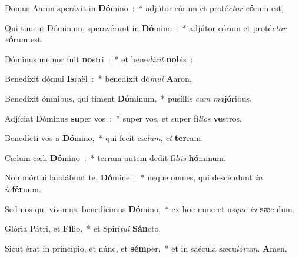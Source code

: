 \documentclass[letterpaper,12pt]{article} %
\begin{document}
\begin{parcolumns}[colwidths={1=268pt},rulebetween]{2}
{\begin{psalmverses}[1]
\item Domus Aaron sperávit in \textbf{Dó}mino~:~* adjútor eórum et proté\emph{ctor} \emph{e}\textbf{ó}rum est,
\item Qui timent Dóminum, speravérunt in \textbf{Dó}mino~:~* adjútor eórum et proté\emph{ctor} \emph{e}\textbf{ó}rum est.
\item Dóminus memor fuit \textbf{no}stri~:~* et bene\emph{dí}\emph{xit} \textbf{no}bis~:
\item Benedíxit dómui \textbf{Is}raël~:~* benedíxit dó\emph{mu}\emph{i} \textbf{A}aron.
\item Benedíxit ómnibus, qui timent \textbf{Dó}minum,~* pusíllis \emph{cum} \emph{ma}\textbf{jó}ribus.
\item Adjíciat Dóminus \textbf{su}per vos~:~* super vos, et super fí\emph{li}\emph{os} \textbf{ve}stros.
\item Benedícti vos a \textbf{Dó}mino,~* qui fecit cæ\emph{lum}, \emph{et} \textbf{ter}ram.
\item Cælum cæli \textbf{Dó}mino~:~* terram autem dedit fí\emph{li}\emph{is} \textbf{hó}\-mi\-num.
\item Non mórtui laudábunt te, \textbf{Dó}mine~:~* neque omnes, qui descéndunt \emph{in} \emph{in}\textbf{fér}num.
\item Sed nos qui vívimus, benedícimus \textbf{Dó}mino,~* ex hoc nunc et us\emph{que} \emph{in} \textbf{sæ}culum.
\item Glória Pátri, et \textbf{Fí}lio,~* et Spirí\emph{tu}\emph{i} \textbf{Sán}cto.
\item Sicut érat in princípio, et núnc, et \textbf{sém}per,~* et in saécula sæcu\emph{ló}\emph{rum}. \textbf{A}men.\end{psalmverses}
}
\end{parcolumns}
\end{document}
